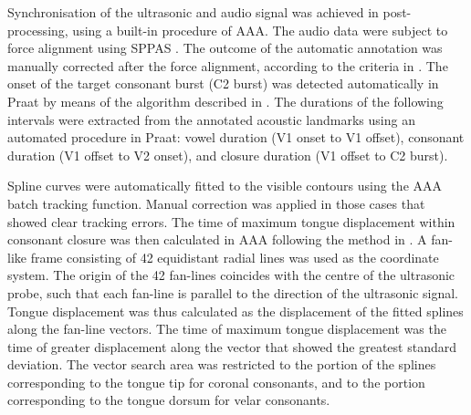 \documentclass[authoryear, twocolumn]{elsarticle}
\begin{document}
Synchronisation of the ultrasonic and audio signal was achieved in
post-processing, using a built-in procedure of AAA. The audio data were
subject to force alignment using SPPAS \citep{bigi2015}. The outcome of
the automatic annotation was manually corrected after the force
alignment, according to the criteria in . The onset
of the target consonant burst (C2 burst) was detected automatically in
Praat \citep{boersma2016} by means of the algorithm described in
\citet{ananthapadmanabha2014}. The durations of the following intervals
were extracted from the annotated acoustic landmarks using an automated
procedure in Praat: vowel duration (V1 onset to V1 offset), consonant
duration (V1 offset to V2 onset), and closure duration (V1 offset to C2
burst).


Spline curves were automatically fitted to the visible contours using
the AAA batch tracking function. Manual correction was applied in those
cases that showed clear tracking errors. The time of maximum tongue
displacement within consonant closure was then calculated in AAA
following the method in \citet{strycharczuk2015}. A fan-like frame
consisting of 42 equidistant radial lines was used as the coordinate
system. The origin of the 42 fan-lines coincides with the centre of the
ultrasonic probe, such that each fan-line is parallel to the direction
of the ultrasonic signal. Tongue displacement was thus calculated as the
displacement of the fitted splines along the fan-line vectors. The time
of maximum tongue displacement was the time of greater displacement
along the vector that showed the greatest standard deviation. The vector
search area was restricted to the portion of the splines corresponding
to the tongue tip for coronal consonants, and to the portion
corresponding to the tongue dorsum for velar consonants.
\end{document}
